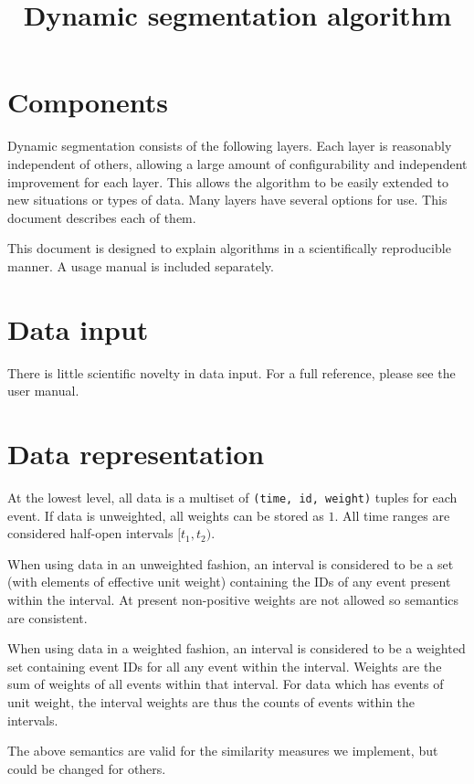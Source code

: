 \documentclass{article}
\title{Dynamic segmentation algorithm}
\begin{document}
\maketitle

\section{Components}

Dynamic segmentation consists of the following layers.  Each layer is
reasonably independent of others, allowing a large amount of
configurability and independent improvement for each layer.  This
allows the algorithm to be easily extended to new situations or types
of data.  Many layers have several options for use.  This document
describes each of them.

This document is designed to explain algorithms in a scientifically
reproducible manner.  A usage manual is included separately.

\section{Data input}
\label{sec:meth-input}
There is little scientific novelty in data input.  For a full
reference, please see the user manual.

\section{Data representation}
\label{sec:meth-representation}
At the lowest level, all data is a multiset of \texttt{(time, id,
  weight)} tuples for each event.  If data is unweighted, all weights
can be stored as $1$.  All time ranges are considered half-open
intervals $[t_1, t_2)$.

When using data in an unweighted fashion, an interval is considered to
be a set (with elements of effective unit weight) containing the IDs
of any event present within the interval.  At present non-positive
weights are not allowed so semantics are consistent.

When using data in a weighted fashion, an interval is considered to be
a weighted set containing event IDs for all any event within the
interval.  Weights are the sum of weights of all events within that
interval.  For data which has events of unit weight, the interval
weights are thus the counts of events within the intervals.

The above semantics are valid for  the similarity measures we
implement, but could be changed for others.
\end{document}
